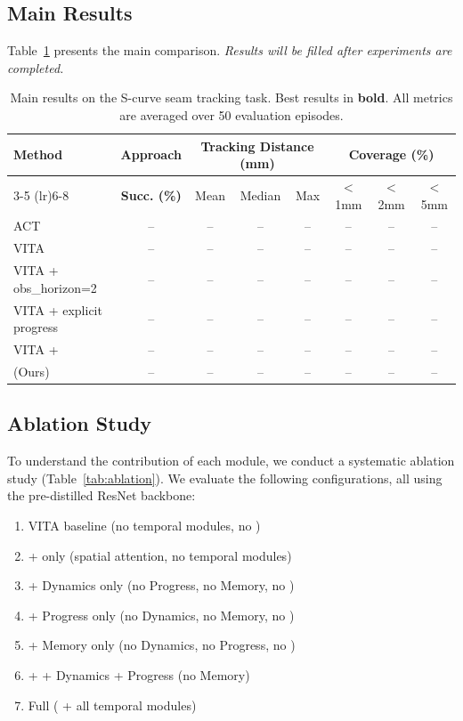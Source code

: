 \subsection{Main Results}
\label{sec:main_results}

Table~\ref{tab:main_results} presents the main comparison. \textit{Results will be filled after experiments are completed.}

\begin{table}[t]
\centering
\caption{Main results on the S-curve seam tracking task. Best results in \textbf{bold}. All metrics are averaged over 50 evaluation episodes.}
\label{tab:main_results}
\begin{tabular}{lccccccc}
\toprule
\multirow{2}{*}{\textbf{Method}} & \textbf{Approach} & \multicolumn{3}{c}{\textbf{Tracking Distance (mm)}} & \multicolumn{3}{c}{\textbf{Coverage (\%)}} \\
\cmidrule(lr){3-5} \cmidrule(lr){6-8}
 & \textbf{Succ. (\%)} & Mean & Median & Max & $<$1mm & $<$2mm & $<$5mm \\
\midrule
ACT~\cite{zhao2023act}            & -- & -- & -- & -- & -- & -- & -- \\
VITA~\cite{gao2026vita}           & -- & -- & -- & -- & -- & -- & -- \\
VITA + obs\_horizon=2             & -- & -- & -- & -- & -- & -- & -- \\
VITA + explicit progress          & -- & -- & -- & -- & -- & -- & -- \\
VITA + \fasa{}                    & -- & -- & -- & -- & -- & -- & -- \\
\midrule
\method{} (Ours)                  & -- & -- & -- & -- & -- & -- & -- \\
\bottomrule
\end{tabular}
\end{table}

\subsection{Ablation Study}
\label{sec:ablation}

To understand the contribution of each module, we conduct a systematic ablation study (Table~\ref{tab:ablation}). We evaluate the following configurations, all using the pre-distilled ResNet backbone:

\begin{enumerate}[label=(\alph*),leftmargin=*,itemsep=1pt]
    \item VITA baseline (no temporal modules, no \fasa{})
    \item + \fasa{} only (spatial attention, no temporal modules)
    \item + Dynamics only (no Progress, no Memory, no \fasa{})
    \item + Progress only (no Dynamics, no Memory, no \fasa{})
    \item + Memory only (no Dynamics, no Progress, no \fasa{})
    \item + \fasa{} + Dynamics + Progress (no Memory)
    \item Full \method{} (\fasa{} + all temporal modules)
\end{enumerate}


